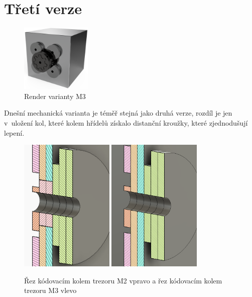 \section{Třetí verze}

\begin{figure}
    \centering
    \includegraphics[width=0.3\textwidth]{kapitoly/obrazky/M3/predni_render.png}
    \caption{Render varianty M3}
    \label{fig:M3-miny-render}
\end{figure}

Dnešní mechanická varianta je téměř stejná jako druhá verze, rozdíl je jen v~uložení kol, které kolem hřídelů získalo distanční kroužky, které
zjednodušují lepení. 

\begin{figure}[h]
    \centering
    \vspace{40mm}
    \includegraphics[width=0.4\textwidth]{kapitoly/obrazky/M3/rez.png}
    \includegraphics[width=0.4\textwidth]{kapitoly/obrazky/M2/rez.png}
    \caption{Řez kódovacím kolem trezoru M2 vpravo a řez kódovacím kolem trezoru M3 vlevo \centering}
    \label{fig:M3-rez-kolem}
\end{figure}

\newpage